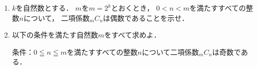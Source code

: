\documentclass[../../main.tex]{subfiles}
\begin{document}
\begin{enumerate}
  \item $k$を自然数とする．
    $m$を$m=2^k$とおくとき，
    $0<n<m$を満たすすべての整数$n$について，
    二項係数$_mC_n$は偶数であることを示せ．
  \item 以下の条件を満たす自然数$m$をすべて求めよ．
    \begin{center}
      条件：$0 \leqq n \leqq m$を満たすすべての整数$n$について二項係数$_mC_n$は奇数である．
    \end{center}
\end{enumerate}
\end{document}
